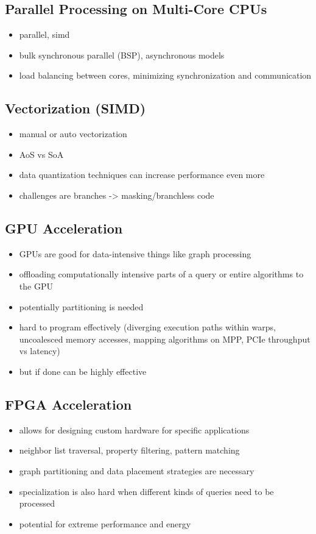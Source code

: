 \documentclass[sigconf,authordraft]{acmart}
\begin{document}
\subsection{Parallel Processing on Multi-Core CPUs}
\begin{itemize}
	\item parallel, simd
	\item bulk synchronous parallel (BSP), asynchronous models
	\item load balancing between cores, minimizing synchronization and communication
\end{itemize}

\subsection{Vectorization (SIMD)}
\begin{itemize}
	\item manual or auto vectorization
	\item AoS vs SoA
	\item data quantization techniques can increase performance even more
	\item challenges are branches -> masking/branchless code
\end{itemize}

\subsection{GPU Acceleration}
\begin{itemize}
	\item GPUs are good for data-intensive things like graph processing
	\item offloading computationally intensive parts of a query or entire algorithms to the GPU
	\item potentially partitioning is needed

	\item hard to program effectively (diverging execution paths within warps, uncoalesced memory accesses, mapping algorithms on MPP, PCIe throughput vs latency)
	\item but if done can be highly effective
\end{itemize}

\subsection{FPGA Acceleration}
\begin{itemize}
	\item allows for designing custom hardware for specific applications
	\item neighbor list traversal, property filtering, pattern matching
	\item graph partitioning and data placement strategies are necessary
	\item specialization is also hard when different kinds of queries need to be processed
	\item potential for extreme performance and energy
\end{itemize}
\end{document}
